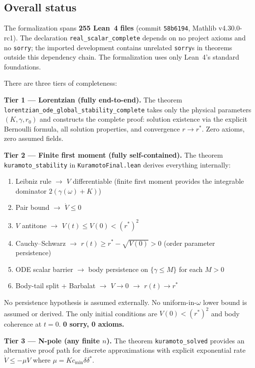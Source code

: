 \documentclass[11pt,a4paper]{article}
\theoremstyle{definition}
\begin{document}
\subsection{Overall status}

The formalization spans \textbf{255 Lean~4 files} (commit \texttt{58b6194}, Mathlib v4.30.0-rc1). The declaration \texttt{real\_scalar\_complete} depends on no project axioms and no \texttt{sorry}; the imported development contains unrelated \texttt{sorry}s in theorems outside this dependency chain. The formalization uses only Lean~4's standard foundations.

There are three tiers of completeness:

\medskip\noindent\textbf{Tier 1 --- Lorentzian (fully end-to-end).} The theorem \texttt{lorentzian\_ode\_global\_stability\_complete} takes only the physical parameters $(K, \gamma, r_0)$ and constructs the complete proof: solution existence via the explicit Bernoulli formula, all solution properties, and convergence $r \to r^*$. Zero axioms, zero assumed fields.

\medskip\noindent\textbf{Tier 2 --- Finite first moment (fully self-contained).} The theorem \texttt{kuramoto\_stability} in \texttt{KuramotoFinal.lean} derives everything internally:
\begin{enumerate}
\item Leibniz rule $\to$ $V$ differentiable (finite first moment provides the integrable dominator $2(\gamma(\omega) + K)$)
\item Pair bound $\to$ $\dot{V} \leq 0$
\item $V$ antitone $\to$ $V(t) \leq V(0) < (r^*)^2$
\item Cauchy--Schwarz $\to$ $r(t) \geq r^* - \sqrt{V(0)} > 0$ (order parameter persistence)
\item ODE scalar barrier $\to$ body persistence on $\{\gamma \leq M\}$ for each $M > 0$
\item Body-tail split + Barbalat $\to$ $V \to 0$ $\to$ $r(t) \to r^*$
\end{enumerate}
No persistence hypothesis is assumed externally. No uniform-in-$\omega$ lower bound is assumed or derived. The only initial conditions are $V(0) < (r^*)^2$ and body coherence at $t = 0$. \textbf{0 sorry, 0 axioms.}

\medskip\noindent\textbf{Tier 3 --- N-pole (any finite $n$).} The theorem \texttt{kuramoto\_solved} provides an alternative proof path for discrete approximations with explicit exponential rate $\dot{V} \leq -\mu V$ where $\mu = K c_{\min}\delta\delta^*$.
\end{document}
